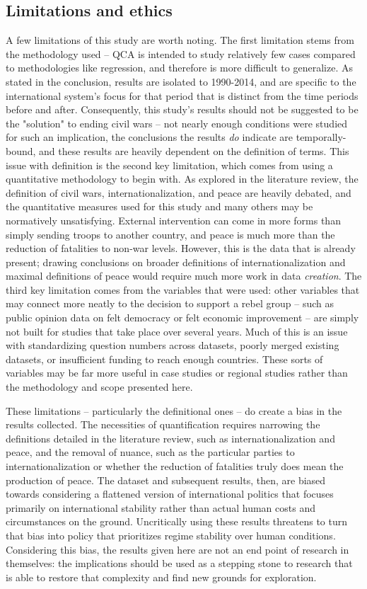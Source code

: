 \documentclass{article}
\begin{document}
\subsection{Limitations and ethics}
A few limitations of this study are worth noting. The first limitation stems from the methodology used -- QCA is intended to study relatively few cases compared to methodologies like regression, and therefore is more difficult to generalize. As stated in the conclusion, results are isolated to 1990-2014, and are specific to the international system's focus for that period that is distinct from the time periods before and after. Consequently, this study's results should not be suggested to be the "solution" to ending civil wars -- not nearly enough conditions were studied for such an implication, the conclusions the results \textit{do} indicate are temporally-bound, and these results are heavily dependent on the definition of terms. This issue with definition is the second key limitation, which comes from using a quantitative methodology to begin with. As explored in the literature review, the definition of civil wars, internationalization, and peace are heavily debated, and the quantitative measures used for this study and many others may be normatively unsatisfying. External intervention can come in more forms than simply sending troops to another country, and peace is much more than the reduction of fatalities to non-war levels. However, this is the data that is already present; drawing conclusions on broader definitions of internationalization and maximal definitions of peace would require much more work in data \textit{creation}. The third key limitation comes from the variables that were used: other variables that may connect more neatly to the decision to support a rebel group -- such as public opinion data on felt democracy or felt economic improvement -- are simply not built for studies that take place over several years. Much of this is an issue with standardizing question numbers across datasets, poorly merged existing datasets, or insufficient funding to reach enough countries. These sorts of variables may be far more useful in case studies or regional studies rather than the methodology and scope presented here.

These limitations -- particularly the definitional ones -- do create a bias in the results collected. The necessities of quantification requires narrowing the definitions detailed in the literature review, such as internationalization and peace, and the removal of nuance, such as the particular parties to internationalization or whether the reduction of fatalities truly does mean the production of peace. The dataset and subsequent results, then, are biased towards considering a flattened version of international politics that focuses primarily on international stability rather than actual human costs and circumstances on the ground. Uncritically using these results threatens to turn that bias into policy that prioritizes regime stability over human conditions. Considering this bias, the results given here are not an end point of research in themselves: the implications should be used as a stepping stone to research that is able to restore that complexity and find new grounds for exploration. 
\end{document}
